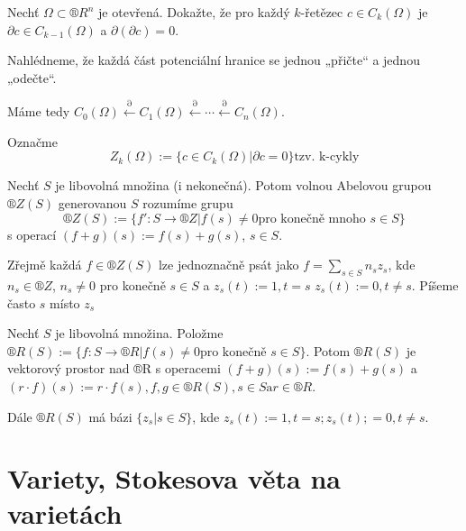 \documentclass[12pt]{article}					%
\begin{document}
        \begin{priklad}
            Nechť $\Omega \subset ®R^n$ je otevřená. Dokažte, že pro každý $k$-řetězec $c \in C_k(\Omega)$ je $\partial c \in C_{k-1}(\Omega)$ a $\partial(\partial c) = 0$.

            \begin{dukaz}
                Nahlédneme, že každá část potenciální hranice se jednou „přičte“ a jednou „odečte“.
            \end{dukaz}
        \end{priklad}

        \begin{veta}
            Máme tedy $C_0(\Omega) \overset{\partial}{\leftarrow} C_1(\Omega) \overset{\partial}{\leftarrow} \cdots \overset{\partial}{\leftarrow} C_n(\Omega)$.

            Označme
            $$ Z_k(\Omega) := \{c \in C_k(\Omega) | \partial c = 0\} \text{tzv. k-cykly} $$
        \end{veta}

        \begin{poznamka}[Ze cvičení]
            Nechť $S$ je libovolná množina (i nekonečná). Potom volnou Abelovou grupou $®Z(S)$ generovanou $S$ rozumíme grupu
            $$ ®Z(S) := \{f': S\rightarrow ®Z| f(s)≠0 \text{pro konečně mnoho $s\in S$}\} $$
            s operací $(f + g)(s) := f(s) + g(s)$, $s \in S$.

            Zřejmě každá $f \in ®Z(S)$ lze jednoznačně psát jako $f = \sum_{s \in S}n_s z_s$, kde $n_s \in ®Z$, $n_s ≠ 0$ pro konečně $s\in S$ a $z_s(t):=1, t=s$ $z_s(t):= 0, t≠s$. Píšeme často $s$ místo $z_s$
        \end{poznamka}

        \begin{poznamka}[Ze cvičení]
            Nechť $S$ je libovolná množina. Položme $®R(S) := \{f: S \rightarrow ®R| f(s) ≠ 0 \text{pro konečně $s\in S$}\}$. Potom $®R(S)$ je vektorový prostor nad ®R s operacemi $(f+g)(s) := f(s) + g(s)$ a $(r·f)(s) := r·f(s), f, g \in ®R(S), s\in S \text{a} r\in ®R$.

            Dále $®R(S)$ má bázi $\{z_s | s \in S\}$, kde $z_s(t) := 1, t=s; z_s(t) ;= 0, t≠s$. 
        \end{poznamka}

\section{Variety, Stokesova věta na varietách}

    
\end{document}
